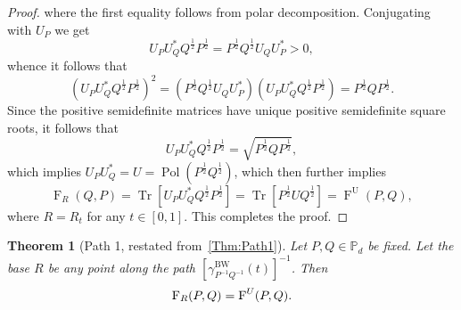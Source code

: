 \documentclass[12pt]{article}
\newtheorem{theorem}{Theorem}[section] %
\theoremstyle{definition}
\begin{document}
\begin{proof}
where the first equality follows from polar decomposition. Conjugating with $U_P$ we get
\begin{equation}
U_P U_Q^* Q^{\frac 12} P^{\frac 12} = P^{\frac 12} Q^{\frac 12} U_Q U_P^*   > 0,
\end{equation}
whence it follows that
\begin{equation}
\left(U_P U_Q^* Q^{\frac 12} P^{\frac 12}\right)^2 = \left(P^{\frac 12} Q^{\frac 12} U_Q U_P^* \right) \left(U_P U_Q^* Q^{\frac 12} P^{\frac 12}\right) = P^{\frac 12} Q P^{\frac 12}.
\end{equation}
Since the positive semidefinite matrices have unique positive semidefinite square roots, it follows that
\begin{equation}
U_P U_Q^* Q^{\frac 12} P^{\frac 12} = \sqrt{P^{\frac 12} Q P^{\frac 12}},
\end{equation}
which implies $U_P U_Q^* = U = \operatorname{Pol}\left(P^{\frac 12} Q^{\frac 12}\right)$, which then further implies
\begin{equation}
\operatorname{F}_R(Q,P) 
= \operatorname{Tr}\left[U_P U_Q^* Q^{\frac 12} P^{\frac 12}\right] = \operatorname{Tr}\left[P^{\frac 12} U Q^{\frac 12}\right] = \operatorname{F}^\mathrm{U}(P,Q),
\end{equation}
where $R = R_t$ for any $t \in [0,1]$. This completes the proof.
\end{proof}


\begin{theorembox}
    \begin{theorem}[Path 1, restated from~\ref{Thm:Path1}] \label{AppThm:Path1}
        Let $P, Q \in \mathbb P_d$ be fixed. Let the base $R$ be any point along the path $[\gamma^{\mathrm{BW}}_{P^{-1} Q^{-1}}(t)]^{-1}$. Then
        \begin{equation}
            \operatorname{F}_R(P,Q) = \operatorname{F}^{\emph U}(P,Q). 
        \end{equation}
    \end{theorem}
\end{theorembox}
\end{document}
